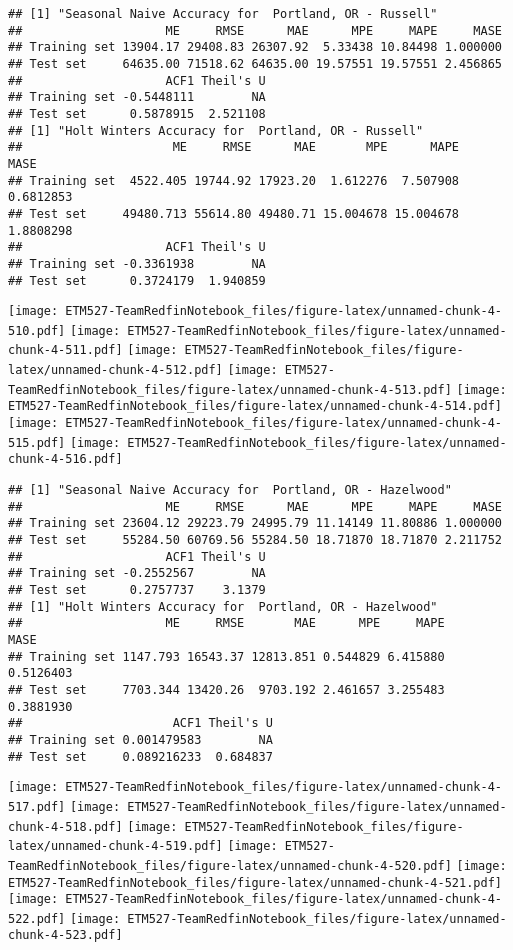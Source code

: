 \documentclass[]{article}
\begin{document}
\begin{verbatim}
## [1] "Seasonal Naive Accuracy for  Portland, OR - Russell"
##                    ME     RMSE      MAE      MPE     MAPE     MASE
## Training set 13904.17 29408.83 26307.92  5.33438 10.84498 1.000000
## Test set     64635.00 71518.62 64635.00 19.57551 19.57551 2.456865
##                    ACF1 Theil's U
## Training set -0.5448111        NA
## Test set      0.5878915  2.521108
## [1] "Holt Winters Accuracy for  Portland, OR - Russell"
##                     ME     RMSE      MAE       MPE      MAPE      MASE
## Training set  4522.405 19744.92 17923.20  1.612276  7.507908 0.6812853
## Test set     49480.713 55614.80 49480.71 15.004678 15.004678 1.8808298
##                    ACF1 Theil's U
## Training set -0.3361938        NA
## Test set      0.3724179  1.940859
\end{verbatim}

\texttt{[image: ETM527-TeamRedfinNotebook\_files/figure-latex/unnamed-chunk-4-510.pdf]}
\texttt{[image: ETM527-TeamRedfinNotebook\_files/figure-latex/unnamed-chunk-4-511.pdf]}
\texttt{[image: ETM527-TeamRedfinNotebook\_files/figure-latex/unnamed-chunk-4-512.pdf]}
\texttt{[image: ETM527-TeamRedfinNotebook\_files/figure-latex/unnamed-chunk-4-513.pdf]}
\texttt{[image: ETM527-TeamRedfinNotebook\_files/figure-latex/unnamed-chunk-4-514.pdf]}
\texttt{[image: ETM527-TeamRedfinNotebook\_files/figure-latex/unnamed-chunk-4-515.pdf]}
\texttt{[image: ETM527-TeamRedfinNotebook\_files/figure-latex/unnamed-chunk-4-516.pdf]}

\begin{verbatim}
## [1] "Seasonal Naive Accuracy for  Portland, OR - Hazelwood"
##                    ME     RMSE      MAE      MPE     MAPE     MASE
## Training set 23604.12 29223.79 24995.79 11.14149 11.80886 1.000000
## Test set     55284.50 60769.56 55284.50 18.71870 18.71870 2.211752
##                    ACF1 Theil's U
## Training set -0.2552567        NA
## Test set      0.2757737    3.1379
## [1] "Holt Winters Accuracy for  Portland, OR - Hazelwood"
##                    ME     RMSE       MAE      MPE     MAPE      MASE
## Training set 1147.793 16543.37 12813.851 0.544829 6.415880 0.5126403
## Test set     7703.344 13420.26  9703.192 2.461657 3.255483 0.3881930
##                     ACF1 Theil's U
## Training set 0.001479583        NA
## Test set     0.089216233  0.684837
\end{verbatim}

\texttt{[image: ETM527-TeamRedfinNotebook\_files/figure-latex/unnamed-chunk-4-517.pdf]}
\texttt{[image: ETM527-TeamRedfinNotebook\_files/figure-latex/unnamed-chunk-4-518.pdf]}
\texttt{[image: ETM527-TeamRedfinNotebook\_files/figure-latex/unnamed-chunk-4-519.pdf]}
\texttt{[image: ETM527-TeamRedfinNotebook\_files/figure-latex/unnamed-chunk-4-520.pdf]}
\texttt{[image: ETM527-TeamRedfinNotebook\_files/figure-latex/unnamed-chunk-4-521.pdf]}
\texttt{[image: ETM527-TeamRedfinNotebook\_files/figure-latex/unnamed-chunk-4-522.pdf]}
\texttt{[image: ETM527-TeamRedfinNotebook\_files/figure-latex/unnamed-chunk-4-523.pdf]}
\end{document}

